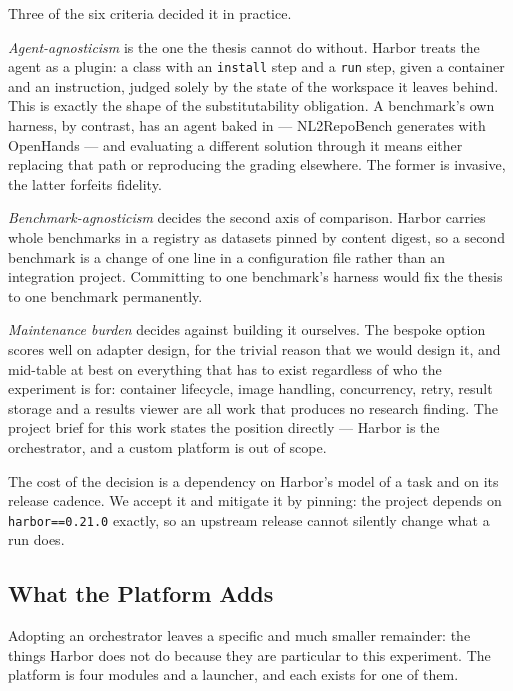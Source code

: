 Three of the six criteria decided it in practice.

\emph{Agent-agnosticism} is the one the thesis cannot do without. Harbor treats
the agent as a plugin: a class with an \texttt{install} step and a \texttt{run}
step, given a container and an instruction, judged solely by the state of the
workspace it leaves behind. This is exactly the shape of the substitutability
obligation. A benchmark's own harness, by contrast, has an agent baked in ---
NL2RepoBench generates with OpenHands --- and evaluating a different solution
through it means either replacing that path or reproducing the grading
elsewhere. The former is invasive, the latter forfeits fidelity.

\emph{Benchmark-agnosticism} decides the second axis of comparison. Harbor
carries whole benchmarks in a registry as datasets pinned by content digest, so
a second benchmark is a change of one line in a configuration file rather than
an integration project. Committing to one benchmark's harness would fix the
thesis to one benchmark permanently.

\emph{Maintenance burden} decides against building it ourselves. The bespoke
option scores well on adapter design, for the trivial reason that we would
design it, and mid-table at best on everything that has to exist regardless of
who the experiment is for: container lifecycle, image handling,
concurrency, retry, result storage and a results viewer are all work that
produces no research finding. The project brief for this work states the
position directly --- Harbor is the orchestrator, and a custom platform is out
of scope.

The cost of the decision is a dependency on Harbor's model of a task and on its
release cadence. We accept it and mitigate it by pinning: the project depends
on \texttt{harbor==0.21.0} exactly, so an upstream release cannot silently
change what a run does.


\subsection{What the Platform Adds}

Adopting an orchestrator leaves a specific and much smaller remainder: the
things Harbor does not do because they are particular to this experiment. The
platform is four modules and a launcher, and each exists for one of them.

